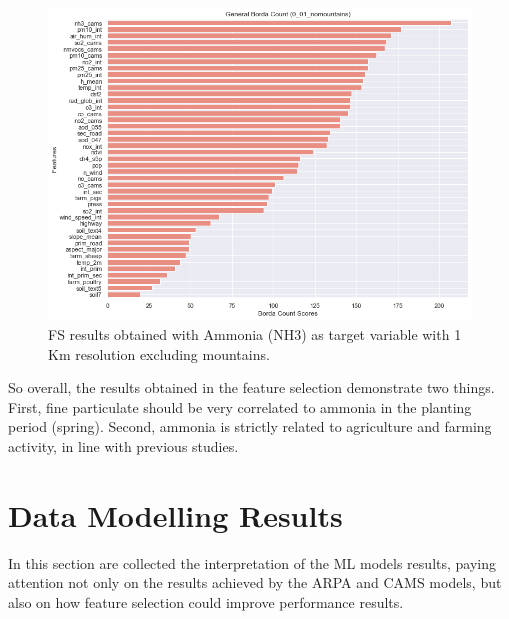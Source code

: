 \begin{figure}[H]
\centering
\includegraphics[scale =0.50]{images/tests/0_01_nomountainsnh3_st.png}
\caption{FS results obtained with Ammonia (NH3) as target variable with 1 Km resolution excluding mountains.}
\label{fig:fs_nh3}
\end{figure}
So overall, the results obtained in the feature selection demonstrate two things.  
First, fine particulate should be very correlated to ammonia in the planting period (spring). Second, ammonia is strictly related to agriculture and farming activity, in line with previous studies.

\section{Data Modelling Results}
In this section are collected the interpretation of the ML models results, paying attention not only on the results achieved by the ARPA and CAMS models, but also on how feature selection could improve performance results. 
